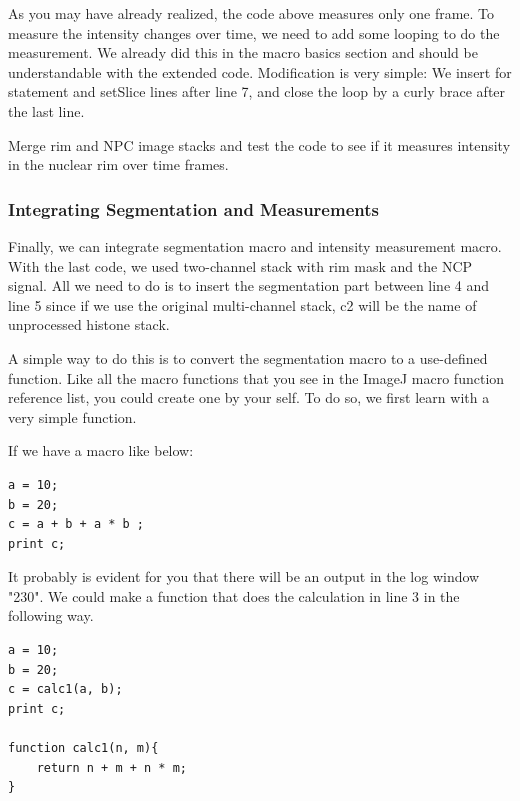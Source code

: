 As you may have already realized, the code above measures only one frame. To measure the intensity changes over time, we need to add some looping to do the measurement. We already did this in the macro basics section and should be understandable with the extended code. Modification is very simple: We insert for statement and setSlice lines after line 7, and close the loop by a curly brace after the last line.  



\begin{indentexercise}{2}
Merge rim and NPC image stacks and test the code to see if it measures intensity in the nuclear rim over time frames. 
\end{indentexercise}

\subsubsection{Integrating Segmentation and Measurements}

Finally, we can integrate segmentation macro and intensity measurement macro. With the last code, we used  two-channel stack with rim mask and the NCP signal. All we need to do is to insert the segmentation part between line 4 and line 5 since if we use the original multi-channel stack, c2 will be the name of unprocessed histone stack. 

A simple way to do this is to convert the segmentation macro to a use-defined function. Like all the macro functions that you see in the ImageJ macro function reference list, you could create one by your self. To do so, we first learn with a very simple function. 

If we have a macro like below:

\begin{lstlisting}
a = 10;
b = 20;
c = a + b + a * b ;
print c;
\end{lstlisting}

It probably is evident for you that there will be an output in the log window "230". We could make a function that does the calculation in line 3 in the following way.

\begin{lstlisting}[morekeywords={*, function, return}]
a = 10;
b = 20;
c = calc1(a, b);
print c;

function calc1(n, m){
	return n + m + n * m;
}
\end{lstlisting}

